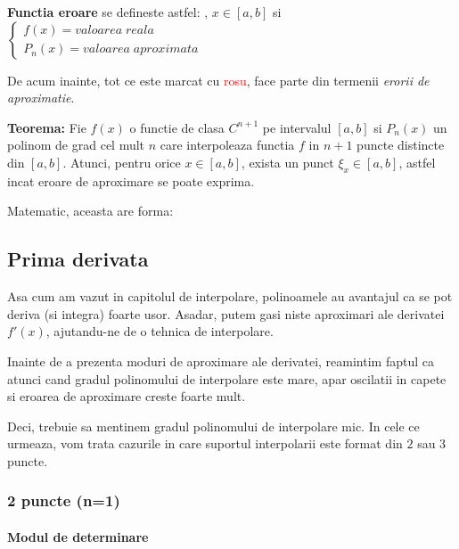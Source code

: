 \documentclass{article}
\begin{document}
\textbf{Functia eroare}\framebox[0.3cm][r]{\footnotemark} se defineste astfel:
, $x \in [a,b]$ si
$\begin{cases}
    f(x) = valoarea\; reala\\
    P_n(x) = valoarea\; aproximata
\end{cases}$

De acum inainte, tot ce este marcat cu \textcolor{red}{rosu}, face parte din termenii \textit{erorii de aproximatie}.\vspace{0.25cm}

\textbf{Teorema:}
Fie $f(x)$ o functie de clasa $C^{n+1}$ pe intervalul $[a,b]$ si $P_n(x)$ un polinom de grad cel mult $n$ care interpoleaza functia $f$ in $n+1$ puncte distincte din $[a,b]$.
Atunci, pentru orice $x \in [a,b]$, exista un punct $\xi_x \in [a,b]$, astfel incat eroare de aproximare se poate exprima.

Matematic, aceasta are forma:


\subsection{Prima derivata}
\tab Asa cum am vazut in capitolul de interpolare, polinoamele au avantajul ca se pot deriva (si integra) foarte usor.
Asadar, putem gasi niste aproximari ale derivatei $f'(x)$, ajutandu-ne de o tehnica de interpolare.

Inainte de a prezenta moduri de aproximare ale derivatei, reamintim faptul ca atunci cand gradul polinomului de interpolare este mare, apar oscilatii in capete si eroarea de aproximare creste foarte mult. 

Deci, trebuie sa mentinem gradul polinomului de interpolare mic. In cele ce urmeaza, vom trata cazurile in care suportul interpolarii este format din $2$ sau $3$ puncte.


\subsubsection{2 puncte (n=1)}
\label{sec:two_point}

\paragraph{Modul de determinare}
\end{document}
